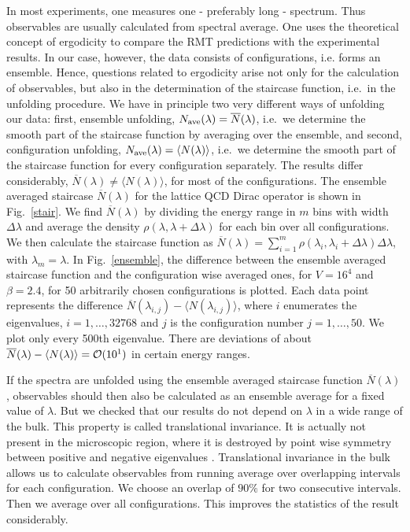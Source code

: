 In most experiments, one measures one - preferably long - spectrum.
Thus observables are usually calculated from spectral average. One
uses the theoretical concept of ergodicity to compare the RMT
predictions with the experimental results.  In our case, however, the
data consists of configurations, i.e. forms an ensemble. Hence,
questions related to ergodicity arise not only for the calculation of
observables, but also in the determination of the staircase function,
i.e.~in the unfolding procedure.  We have in principle two very
different ways of unfolding our data: first, ensemble unfolding,
$N_{\rm ave}(\lambda)=\overline{N}(\lambda)$, i.e.~we determine the
smooth part of the staircase function by averaging over the ensemble,
and second, configuration unfolding, $N_{\rm ave}(\lambda)=\langle
N(\lambda)\rangle$, i.e.~we determine the smooth part of the staircase
function for every configuration separately. The results differ
considerably, $\overline{N}(\lambda)\neq\langle N(\lambda)\rangle$,
for most of the configurations.  The ensemble averaged staircase
$\overline{N}(\lambda)$ for the lattice QCD Dirac operator is shown in
Fig.~\ref{stair}.  We find $\overline{N}(\lambda)$ by dividing the
energy range in $m$ bins with width $\Delta\lambda$ and average the
density $\rho(\lambda,\lambda+\Delta\lambda)$ for each bin over all
configurations. We then calculate the staircase function as
$\overline{N}(\lambda)=\sum_{i=1}^m\rho(\lambda_i,
\lambda_i+\Delta\lambda)\Delta\lambda$, with $\lambda_m=\lambda$.  In
Fig.~\ref{ensemble}, the difference between the ensemble averaged
staircase function and the configuration wise averaged ones, for
$V=16^4$ and $\beta=2.4$, for 50 arbitrarily chosen configurations is
plotted.  Each data point represents the difference
$\overline{N}(\lambda_{i,j})-\langle N(\lambda_{i,j})\rangle$, where
$i$ enumerates the eigenvalues, $i=1,\ldots,32768$ and $j$ is the
configuration number $j=1,\ldots,50$. We plot only every 500th
eigenvalue.  There are deviations of about
$\overline{N}(\lambda)-\langle N(\lambda)\rangle={\cal O}(10^1)$ in
certain energy ranges.

If the spectra are unfolded using the ensemble averaged staircase
function $\overline{N}(\lambda)$, observables should then also be
calculated as an ensemble average for a fixed value of $\lambda$. But
we checked that our results do not depend on $\lambda$ in a wide range
of the bulk.  This property is called translational invariance. It is
actually not present in the microscopic region, where it is destroyed
by point wise symmetry between positive and negative eigenvalues
\cite{bitsch98}. Translational invariance in the bulk allows us to
calculate observables from running average over overlapping intervals
for each configuration. We choose an overlap of $90\%$ for two
consecutive intervals. Then we average over all configurations. This
improves the statistics of the result considerably.

